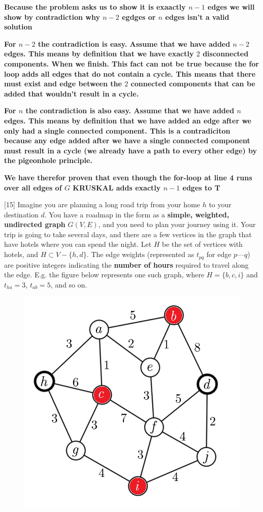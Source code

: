 \documentclass[addpoints]{exam}
\def\mysolution#1{}    %
\begin{document}
\begin{questions}
\textbf{Because the problem asks us to show it is exaactly $n-1$ edges we will show by contradiction why $n-2$ egdges or $n$ edges isn't a valid solution}

\textbf{For $n-2$ the contradiction is easy. Assume that we have added $n-2$ edges. This means by definition that we have exactly $2$ disconnected components. When we finish. This fact can not be true because the for loop adds all edges that do not contain a cycle. This means that there must exist and edge between the $2$ connected components that can be added that wouldn't result in a cycle.}

\textbf{For $n$ the contradiction is also easy. Assume that we have added $n$ edges. This means by definition that we have added an edge after we only had a single connected component. This is a contradiciton because any edge added after we have a single connected component must result in a cycle (we already have a path to every other edge) by the pigeonhole principle.}

\textbf{We have therefor proven that even though the for-loop at line 4 runs over all edges of $G$ KRUSKAL adds exactly $n-1$ edges to T}

\mysolution{

}

[15]
Imagine you are planning a long road trip from your home $h$ to your destination $d$. You have a roadmap in the form as a \textbf{simple, weighted, undirected graph} $G(V,E)$, and you need to plan your journey using it. Your trip is going to take several days, and there are a few vertices in the graph that have hotels where you can spend the night. Let $H$ be the set of vertices with hotels, and $H \subset V-\{h,d\}$. The edge weights (represented as $t_{pq}$ for edge $p$---$q$) are positive integers indicating the \textbf{number of hours} required to travel along the edge. E.g. the figure below represents one such graph, where $H=\{b,c,i\}$ and $t_{ha}=3$, $t_{ab}=5$, and so on.

\begin{figure}[h!]
    \centering
    \includegraphics[width=0.35\linewidth]{hotels.png}
\end{figure}


\end{questions}
\end{document}
